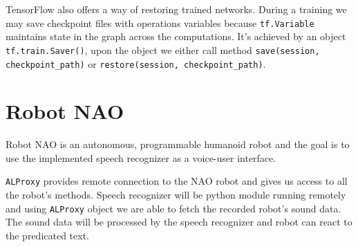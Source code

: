 TensorFlow also offers a way of restoring trained networks. During a training we may save checkpoint files with operations variables because \texttt{tf.Variable} maintains state in the graph across the computations.
It's achieved by an object \texttt{tf.train.Saver()}, upon the object we either call method \texttt{save(session, checkpoint\_path)} or \texttt{restore(session, checkpoint\_path)}.

\section{Robot NAO}

Robot NAO is an autonomous, programmable humanoid robot and the goal is to use the implemented speech recognizer as a voice-user interface.


\texttt{ALProxy} provides remote connection to the NAO robot and gives us access to all the robot's methods.
Speech recognizer will be python module running remotely and using \texttt{ALProxy} object we are able to fetch the recorded robot's sound data.
The sound data will be processed by the speech recognizer and robot can react to the predicated text.
